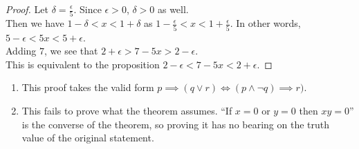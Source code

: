 \documentclass[12pt]{scrartcl} %
\begin{document}
	\begin{proof}
		Let $\delta = \frac{\epsilon}{5}$. Since $\epsilon > 0$, $\delta > 0$ as well. \\Then we have $1 - \delta < x < 1 + \delta$ as $1 - \frac{\epsilon}{5} < x < 1 + \frac{\epsilon}{5}$. In other words, $5 - \epsilon < 5x < 5 + \epsilon$. \\Adding $7$, we see that $2 + \epsilon > 7 - 5x > 2 - \epsilon$. \\This is equivalent to the proposition $2 - \epsilon < 7 - 5x < 2 + \epsilon$.
	\end{proof}

\begin{enumerate}
	\item This proof takes the valid form $p \implies (q \lor r) \iff (p \land \neg q) \implies r)$.
	\item This fails to prove what the theorem assumes. ``If $x = 0$ or $y = 0$ then $xy = 0$'' is the converse of the theorem, so proving it has no bearing on the truth value of the original statement.
\end{enumerate}
\end{document}
